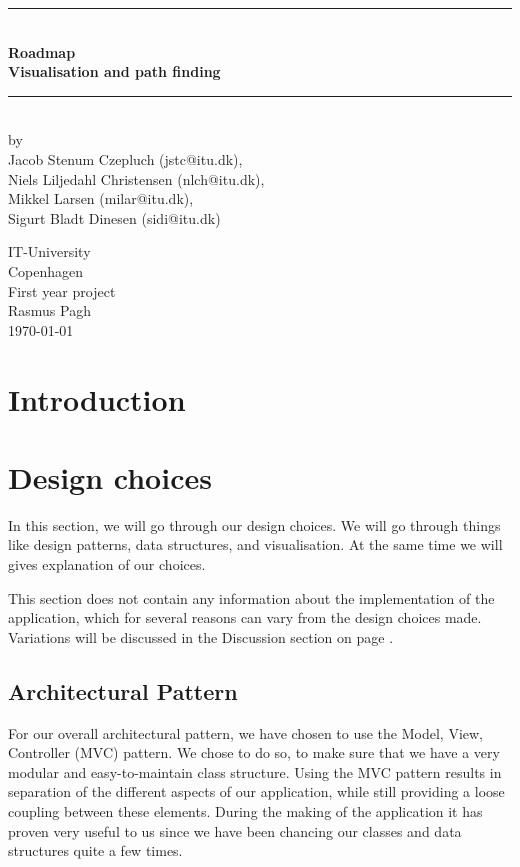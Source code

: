 \documentclass[a4paper,11pt]{article}
\begin{document}
\begin{titlepage}
\centering \parindent=0pt
\newcommand{\HRule}{\rule{\textwidth}{1mm}}
 \HRule\\[1cm]\Huge\bfseries
Roadmap\\[0.7cm]
\large Visualisation and path finding\\[1cm]
\HRule\\[4cm]  \large by \\Jacob Stenum Czepluch (jstc@itu.dk), \\Niels Liljedahl Christensen (nlch@itu.dk), \\Mikkel Larsen (milar@itu.dk), \\Sigurt Bladt Dinesen (sidi@itu.dk) \\
 \normalsize %
\begin{flushleft}
IT-University\\
Copenhagen\\
First year project\\
Rasmus Pagh\\
\today \end{flushleft}
\end{titlepage}

\tableofcontents
\pagebreak

\pagebreak
\section{Introduction}


\pagebreak
\section{Design choices}
\label{sec:Design choices}
In this section, we will go through our design choices. We will go through things like design patterns, data structures, and visualisation. At the same time we will gives explanation of our choices.

This section does not contain any information about the implementation of the application, which for several reasons can vary from the design choices made. Variations will be discussed in the Discussion section on page \pageref{sec:Discussion}.

\subsection{Architectural Pattern}
\label{sub:Design Pattern}
For our overall architectural pattern, we have chosen to use the Model, View, Controller (MVC) pattern. We chose to do so, to make sure that we have a very modular and easy-to-maintain class structure. Using the MVC pattern results in separation of the different aspects of our application, while still providing a loose coupling between these elements. During the making of the application it has proven very useful to us since we have been chancing our classes and data structures quite a few times. 
\end{document}
